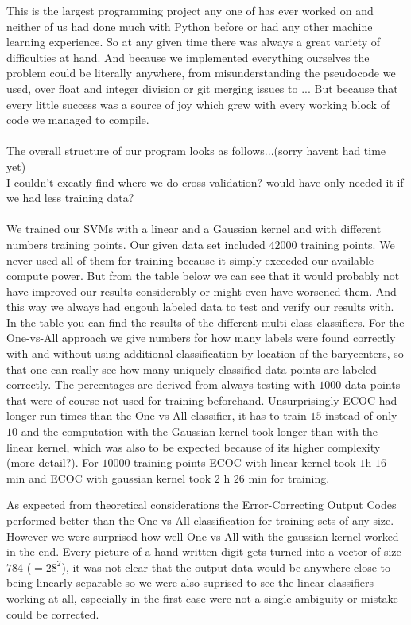 This is the largest programming project any one of has ever worked on and neither of us had done much with Python before or had any other machine learning experience. So at any given time there was always a great variety of difficulties at hand. And because we implemented everything ourselves the problem could be literally anywhere, from misunderstanding the pseudocode we used, over float and integer division or git merging issues to ... But because that every little success was a source of joy which grew with every working block of code we managed to compile.
\\
\\
The overall structure of our program looks as follows...(sorry havent had time yet) 
\\
I couldn't excatly find where we do cross validation? would have only needed it if we had less training data?
\\
\\
We trained our SVMs with a linear and a Gaussian kernel and with different numbers training points. Our given data set included $42 000$ training points. We never used all of them for training because it simply exceeded our available compute power. But from the table below we can see that it would probably not have improved our results considerably or might even have worsened them. And this way we always had engouh labeled data to test and verify our results with. In the table you can find the results of the different multi-class classifiers. For the One-vs-All approach we give numbers for how many labels were found correctly with and without using additional classification by location of the barycenters, so that one can really see how many uniquely classified data points are labeled correctly. The percentages are derived from always testing with $1000$ data points that were of course not used for training beforehand. Unsurprisingly ECOC had longer run times than the One-vs-All classifier, it has to train $15$ instead of only $10$ and the computation with the Gaussian kernel took longer than with the linear kernel, which was also to be expected because of its higher complexity (more detail?). For $10 000$ training points ECOC with linear kernel took $1$h $16$ min and ECOC with gaussian kernel took $2$ h $26$ min for training.  

As expected from theoretical considerations the Error-Correcting Output Codes performed better than the One-vs-All classification for training sets of any size. However we were surprised how well One-vs-All with the gaussian kernel worked in the end. Every picture of a hand-written digit gets turned into a vector of size $784$ ($=28^2$), it was not clear that the output data would be anywhere close to being linearly separable so we were also suprised to see the linear classifiers working at all, especially in the first case were not a single ambiguity or mistake could be corrected. 


